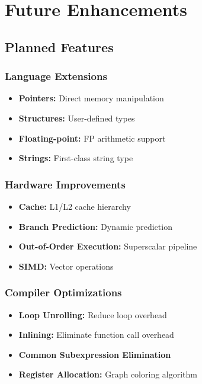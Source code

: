 \documentclass[12pt,a4paper,oneside]{book}
\begin{document}
\chapter{Future Enhancements}

\section{Planned Features}

\subsection{Language Extensions}

\begin{itemize}
    \item \textbf{Pointers:} Direct memory manipulation
    \item \textbf{Structures:} User-defined types
    \item \textbf{Floating-point:} FP arithmetic support
    \item \textbf{Strings:} First-class string type
\end{itemize}

\subsection{Hardware Improvements}

\begin{itemize}
    \item \textbf{Cache:} L1/L2 cache hierarchy
    \item \textbf{Branch Prediction:} Dynamic prediction
    \item \textbf{Out-of-Order Execution:} Superscalar pipeline
    \item \textbf{SIMD:} Vector operations
\end{itemize}

\subsection{Compiler Optimizations}

\begin{itemize}
    \item \textbf{Loop Unrolling:} Reduce loop overhead
    \item \textbf{Inlining:} Eliminate function call overhead
    \item \textbf{Common Subexpression Elimination}
    \item \textbf{Register Allocation:} Graph coloring algorithm
\end{itemize}
\end{document}
